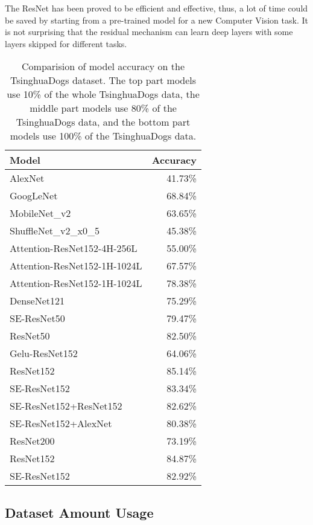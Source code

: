 \documentclass[runningheads]{llncs}
\begin{document}
\par The ResNet has been proved to be efficient and effective, thus, a lot of time could be saved by starting from a pre-trained model for a new Computer Vision task.
It is not surprising that the residual mechanism can learn deep layers with some layers skipped for different tasks.


\begin{table}
\begin{center}
\begin{tabular}{|l|r|}
\hline
Model   &  Accuracy \\
\hline
\hline
AlexNet & 41.73\%\\
GoogLeNet & 68.84\%\\
MobileNet\_v2 & 63.65\%\\
ShuffleNet\_v2\_x0\_5  &	45.38\% \\
Attention-ResNet152-4H-256L &  	55.00\% \\
Attention-ResNet152-1H-1024L &  	67.57\% \\
\hline
\hline
Attention-ResNet152-1H-1024L &  	78.38\% \\
DenseNet121   	&	75.29\% \\
SE-ResNet50 & 79.47\% \\
ResNet50 & 82.50\%\\
Gelu-ResNet152 &	64.06\% \\
ResNet152  	&	85.14\% \\
SE-ResNet152  	&	83.34\% \\
SE-ResNet152+ResNet152 & 82.62\% \\
SE-ResNet152+AlexNet & 80.38\% \\
ResNet200  	&	73.19\% \\
\hline
\hline
ResNet152  	&	84.87\% \\
SE-ResNet152  	&	82.92\% \\
\hline
\end{tabular}
\end{center}
\caption{Comparision of model accuracy on the TsinghuaDogs dataset. The top part models use 10\% of the whole TsinghuaDogs data, the middle part models use 80\% of the TsinghuaDogs data,
and the bottom part models use 100\% of the TsinghuaDogs data.}
\end{table}

\subsection{Dataset Amount Usage}
\end{document}
